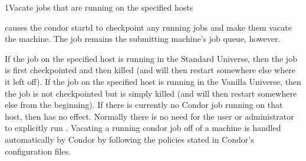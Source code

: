 \begin{ManPage}{}{1}{Vacate jobs that are running on the specified hosts}
\label{man-condor-vacate}
\Synopsis {}

\Description
{} causes the condor startd to checkpoint any running jobs
and make them vacate the machine. The job remains 
the submitting machine's job queue, however. 

If the job on the specified host is running in the Standard Universe, then the
job is first checkpointed and then killed (and will then restart somewhere
else where it left off). If the job on the specified host is running in the
Vanilla Universe, then the job is not checkpointed but is simply killed (and
will then restart somewhere else from the beginning). If there is currently
no Condor job running on that host, then  has no effect. 
 Normally there is no need for the user or administrator to explicitly run
. Vacating a running condor job off of a machine is handled
automatically by Condor by following the policies stated in Condor's
configuration files.   
\begin{Options}
\end{Options}

\end{ManPage}
